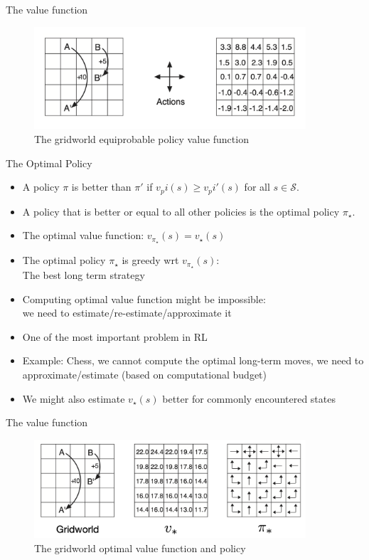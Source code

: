 \documentclass[10pt]{beamer}
\begin{document}
\begin{frame}{The value function}

\begin{figure}[h]
\centering
\includegraphics[width=0.9\textwidth]{fig/sutton_fig_3_5.png}
\caption{The gridworld equiprobable policy value function}
\end{figure}

\end{frame}

\begin{frame}{The Optimal Policy}

\begin{itemize}
\item A policy $\pi$ is {\color{uured}better} than $\pi'$ if $v_pi(s) \geq v_pi'(s)$ for all $s \in \mathcal{S}$.\pause
\item A policy that is better or equal to all other policies is the {\color{uured}optimal policy} $\pi_\star$.\pause
\item The optimal value function: $v_{\pi_\star}(s) = v_\star(s)$\pause
\item The optimal policy $\pi_\star$ is greedy wrt $v_{\pi_\star}(s)$: \\The best long term strategy\pause
\item Computing optimal value function might be {\color{uured}impossible}:\\ we need to estimate/re-estimate/approximate it\pause
\item One of the most important problem in RL\pause
\item {\color{uured}Example}: Chess, we cannot compute the optimal long-term moves, we need to approximate/estimate (based on computational budget)\pause
\item We might also estimate $v_\star(s)$ better for commonly encountered states
\end{itemize}

\end{frame}

\begin{frame}{The value function}

\begin{figure}[h]
\centering
\includegraphics[width=0.9\textwidth]{fig/sutton_fig_3_8.png}
\caption{The gridworld optimal value function and policy}
\end{figure}

\end{frame}
\end{document}
